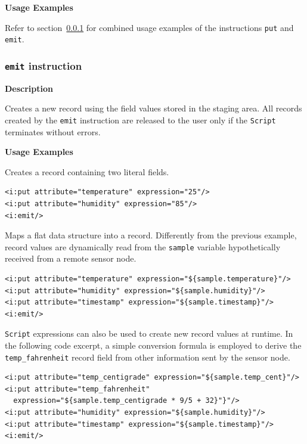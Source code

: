 \textbf{Usage Examples}

Refer to section~\ref{sec:emit_instruction} for combined usage examples of the
instructions \texttt{put} and \texttt{emit}.


\subsubsection{\texttt{emit} instruction}
\label{sec:emit_instruction}

\textbf{Description}

Creates a new record using the field values stored in the staging area. All
records created by the \texttt{emit} instruction are released to the user only
if the \texttt{Script} terminates without errors.

\textbf{Usage Examples}

Creates a record containing two literal fields.

\lstset{language=XML}
\begin{lstlisting}
<i:put attribute="temperature" expression="25"/>
<i:put attribute="humidity" expression="85"/>
<i:emit/>
\end{lstlisting}

Maps a flat data structure into a record. Differently from the previous
example, record values are dynamically read from the \texttt{sample} variable
hypothetically received from a remote sensor node.

\lstset{language=XML}
\begin{lstlisting}
<i:put attribute="temperature" expression="${sample.temperature}"/>
<i:put attribute="humidity" expression="${sample.humidity}"/>
<i:put attribute="timestamp" expression="${sample.timestamp}"/>
<i:emit/>
\end{lstlisting}

\texttt{Script} expressions can also be used to create new record values at
runtime. In the following code excerpt, a simple conversion formula is employed
to derive the \texttt{temp\_fahrenheit} record field from other information
sent by the sensor node.

\lstset{language=XML}
\begin{lstlisting}
<i:put attribute="temp_centigrade" expression="${sample.temp_cent}"/>
<i:put attribute="temp_fahrenheit"
  expression="${sample.temp_centigrade * 9/5 + 32}"}"/>
<i:put attribute="humidity" expression="${sample.humidity}"/>
<i:put attribute="timestamp" expression="${sample.timestamp}"/>
<i:emit/>
\end{lstlisting}

